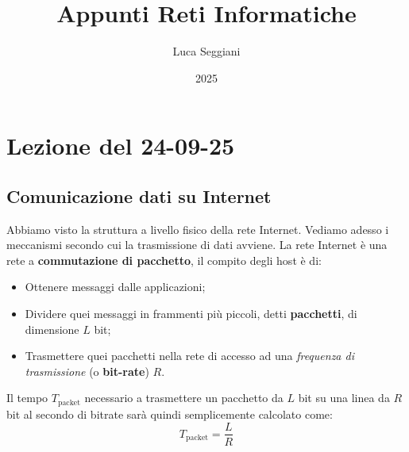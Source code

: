 \documentclass[a4paper,11pt]{article}
\title{Appunti Reti Informatiche}
\author{Luca Seggiani}
\date{2025}
\begin{document}
\section{Lezione del 24-09-25}

\thispagestyle{empty}
\pagestyle{fancy}

\subsection{Comunicazione dati su Internet}
Abbiamo visto la struttura a livello fisico della rete Internet.
Vediamo adesso i meccanismi secondo cui la trasmissione di dati avviene.
La rete Internet è una rete a \textbf{commutazione di pacchetto}, il compito degli host è di:
\begin{itemize}
	\item Ottenere messaggi dalle applicazioni;
	\item Dividere quei messaggi in frammenti più piccoli, detti \textbf{pacchetti}, di dimensione $L$ bit;
	\item Trasmettere quei pacchetti nella rete di accesso ad una \textit{frequenza di trasmissione} (o \textbf{bit-rate}) $R$.
\end{itemize}

Il tempo $T_{\text{packet}}$ necessario a trasmettere un pacchetto da $L$ bit su una linea da $R$ bit al secondo di bitrate sarà quindi semplicemente calcolato come:
$$
T_{\text{packet}} = \frac{L}{R}
$$
\end{document}
